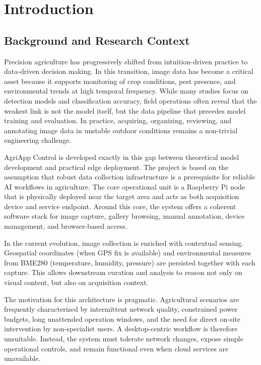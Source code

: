 \section{Introduction}

\subsection{Background and Research Context}
Precision agriculture has progressively shifted from intuition-driven practice to data-driven decision making. In this transition, image data has become a critical asset because it supports monitoring of crop conditions, pest presence, and environmental trends at high temporal frequency. While many studies focus on detection models and classification accuracy, field operations often reveal that the weakest link is not the model itself, but the data pipeline that precedes model training and evaluation. In practice, acquiring, organizing, reviewing, and annotating image data in unstable outdoor conditions remains a non-trivial engineering challenge.

AgriApp Control is developed exactly in this gap between theoretical model development and practical edge deployment. The project is based on the assumption that robust data collection infrastructure is a prerequisite for reliable AI workflows in agriculture. The core operational unit is a Raspberry Pi node that is physically deployed near the target area and acts as both acquisition device and service endpoint. Around this core, the system offers a coherent software stack for image capture, gallery browsing, manual annotation, device management, and browser-based access.

In the current evolution, image collection is enriched with contextual sensing. Geospatial coordinates (when GPS fix is available) and environmental measures from BME280 (temperature, humidity, pressure) are persisted together with each capture. This allows downstream curation and analysis to reason not only on visual content, but also on acquisition context.

The motivation for this architecture is pragmatic. Agricultural scenarios are frequently characterized by intermittent network quality, constrained power budgets, long unattended operation windows, and the need for direct on-site intervention by non-specialist users. A desktop-centric workflow is therefore unsuitable. Instead, the system must tolerate network changes, expose simple operational controls, and remain functional even when cloud services are unavailable.

